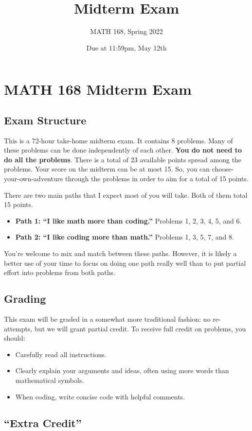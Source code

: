 \documentclass{hw}
\title{Midterm Exam}
\author{MATH 168, Spring 2022}
\date{Due at 11:59pm, May 12th}
\begin{document}
\section*{MATH 168 Midterm Exam}


\subsection*{Exam Structure}

This is a 72-hour take-home midterm exam. 
It contains 8 problems. 
Many of these problems can be done independently of each other. 
\textbf{You do not need to do all the problems}. 
There is a total of 23 available points spread among the problems. 
Your score on the midterm can be at most 15. 
So, you can choose-your-own-adventure through the problems in order to aim for a total of 15 points. 

There are two main paths that I expect most of you will take. 
Both of them total 15 points. 
\begin{itemize}
    \item \textbf{Path 1: ``I like math more than coding.''} Problems 1, 2, 3, 4, 5, and 6. 
    \item \textbf{Path 2: ``I like coding more than math.''} Problems 1, 3, 5, 7, and 8. 
\end{itemize}
You're welcome to mix and match between these paths. 
However, it is likely a better use of your time to focus on doing one path really well than to put partial effort into problems from both paths. 

\subsection*{Grading}

This exam will be graded in a somewhat more traditional fashion: no re-attempts, but we will grant partial credit. 
To receive full credit on problems, you should: 
\begin{itemize}
    \item Carefully read all instructions. 
    \item Clearly explain your arguments and ideas, often using more words than mathematical symbols. 
    \item When coding, write concise code with helpful comments. 
\end{itemize}

\subsection*{``Extra Credit''}
\end{document}
